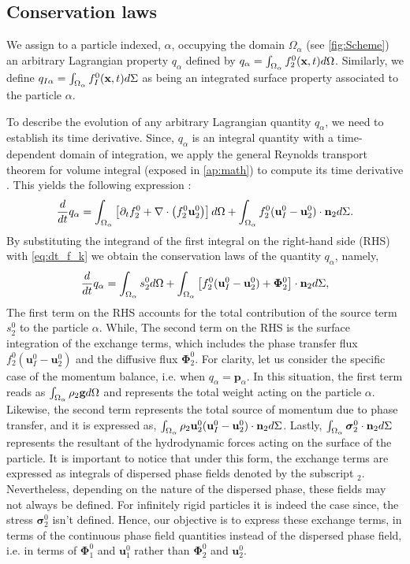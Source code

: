 \subsection{Conservation laws}
We assign to a particle indexed, $\alpha$, occupying the domain $\Omega_\alpha$ (see \ref{fig:Scheme}) an arbitrary Lagrangian property $q_\alpha$ defined by $q_\alpha  = \int_{\Omega_\alpha}  f_2^0(\textbf{x},t)  d\Omega$.
Similarly, we define $q_{I\alpha} = \int_{\Omega_\alpha}  f_I^0(\textbf{x},t)  d\Sigma$ as being an integrated surface property associated to the particle $\alpha$.


To describe the evolution of any arbitrary Lagrangian quantity $q_\alpha$, we need to establish its time derivative.
Since, $q_\alpha$ is an integral quantity with a time-dependent domain of integration, we apply the general Reynolds transport theorem for volume integral (exposed in \ref{ap:math}) to compute its time derivative \citep{morel2015mathematical}.
This yields the following expression :
\begin{equation}
    \frac{d}{d t}  q_\alpha
    = \int_{\Omega_\alpha} \left[ \partial_t f_2^0 + \mathbf{\nabla}\cdot\left(f_2^0\textbf{u}_2^0\right) \right] d\Omega\\
    + \int_{\Omega_\alpha}  f_2^0 (\textbf{u}_I^0-\textbf{u}_2^0)\cdot \textbf{n}_2  d\Sigma.
\end{equation}
By substituting the integrand of the first integral on the right-hand side (RHS) with \ref{eq:dt_f_k} we obtain the conservation laws of the quantity $q_\alpha$, namely,  
\begin{equation}
    \frac{d}{d t}  q_\alpha
    = \int_{\Omega_\alpha}  s_2^0  d\Omega
    + \int_{\Omega_\alpha}  \left[
        f_2^0 (\textbf{u}_I^0-\textbf{u}_2^0) 
        + \mathbf{\Phi}_2^0 
        \right] \cdot \textbf{n}_2  d\Sigma,
    \label{eq:dt_q_alpha}
\end{equation}
The first term on the RHS accounts for the total contribution of the source term $s_2^0$ to the particle $\alpha$.
While, The second term on the RHS is the surface integration of the exchange terms, which includes the phase transfer flux $f_2^0 (\textbf{u}_I^0-\textbf{u}_2^0)$ and the diffusive flux $\mathbf{\Phi}_2^0$. 
For clarity, let us consider the specific case of the momentum balance, i.e. when $q_\alpha = \textbf{p}_\alpha$.
In this situation, the first term reads as $\int_{\Omega_\alpha}  \rho_2\textbf{g}  d\Omega$ and represents the total weight acting on the particle $\alpha$. 
Likewise, the second term represents the total source of momentum due to phase transfer, and it is expressed as, $\int_{\Omega_\alpha}  \rho_2 \textbf{u}_2^0 (\textbf{u}_I^0-\textbf{u}_2^0)\cdot\textbf{n}_2  d\Sigma$. 
Lastly, $\int_{\Omega_\alpha}  \bm{\sigma}_2^0\cdot\textbf{n}_2  d\Sigma$ represents the resultant of the hydrodynamic forces acting on the surface of the particle.
It is important to notice that under this form, the exchange terms are expressed as integrals of dispersed phase fields denoted by the subscript $_2$.
Nevertheless, depending on the nature of the dispersed phase, these fields may not always be defined.
For infinitely rigid particles it is indeed the case since, the stress $\bm{\sigma}_2^0$ isn't defined.  
Hence, our objective is to express these exchange terms, in terms of the continuous phase field quantities instead of the dispersed phase field, i.e. in terms of $\mathbf{\Phi}_1^0$ and $\textbf{u}_1^0$ rather than $\mathbf{\Phi}_2^0$ and $\textbf{u}_2^0$. 

